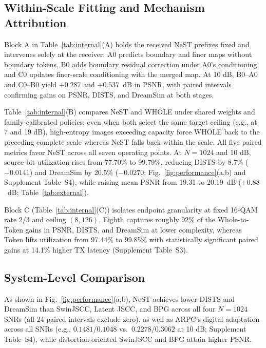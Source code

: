 
\ifCLASSOPTIONonecolumn\else\fi
\subsection{Within-Scale Fitting and Mechanism Attribution}
Block A in Table~\ref{tab:internal}(A) holds the received NeST prefixes fixed and intervenes solely at the receiver: A0 predicts boundary and finer maps without boundary tokens, B0 adds boundary residual correction under A0's conditioning, and C0 updates finer-scale conditioning with the merged map. At 10 dB, B0--A0 and C0--B0 yield $+0.287$ and $+0.537$~dB in PSNR, with paired intervals confirming gains on PSNR, DISTS, and DreamSim at both stages.

Table~\ref{tab:internal}(B) compares NeST and WHOLE under shared weights and family-calibrated policies; even when both select the same target ceiling (e.g., at 7 and 19 dB), high-entropy images exceeding capacity force WHOLE back to the preceding complete scale whereas NeST falls back within the scale. All five paired metrics favor NeST across all seven operating points. At $N=1024$ and 10 dB, source-bit utilization rises from 77.70\% to 99.79\%, reducing DISTS by 8.7\% ($-0.0141$) and DreamSim by 20.5\% ($-0.0270$; Fig.~\ref{fig:performance}(a,b) and Supplement Table~S4), while raising mean PSNR from 19.31 to 20.19~dB ($+0.88$~dB; Table~\ref{tab:external}).

Block C (Table~\ref{tab:internal}(C)) isolates endpoint granularity at fixed 16-QAM rate $2/3$ and ceiling $(8,126)$. Eighth captures roughly 92\% of the Whole-to-Token gains in PSNR, DISTS, and DreamSim at lower complexity, whereas Token lifts utilization from 97.44\% to 99.85\% with statistically significant paired gains at 14.1\% higher TX latency (Supplement Table~S3).

\subsection{System-Level Comparison}
\ifCLASSOPTIONonecolumn\fi

As shown in Fig.~\ref{fig:performance}(a,b), NeST achieves lower DISTS and DreamSim than SwinJSCC, Latent JSCC, and BPG across all four $N=1024$ SNRs (all 24 paired intervals exclude zero), as well as ARPC's digital adaptation across all SNRs (e.g., $0.1481/0.1048$ vs.\ $0.2278/0.3062$ at 10 dB; Supplement Table~S4), while distortion-oriented SwinJSCC and BPG attain higher PSNR.

